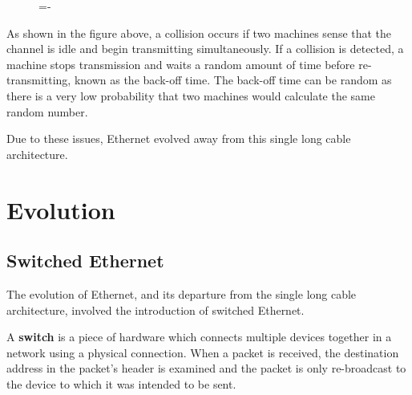 \documentclass[a4paper]{systems-software}
\begin{document}
\begin{figure}[H]
	\lineskip=-\fboxrule
\end{figure}

As shown in the figure above, a collision occurs if two machines sense that the channel is idle and begin transmitting simultaneously. If a collision is detected, a machine stops transmission and waits a random amount of time before re-transmitting, known as the back-off time. The back-off time can be random as there is a very low probability that two machines would calculate the same random number.

Due to these issues, Ethernet evolved away from this single long cable architecture.


\section*{Evolution}

\subsection*{Switched Ethernet}

The evolution of Ethernet, and its departure from the single long cable architecture, involved the introduction of switched Ethernet.

A \textbf{switch} is a piece of hardware which connects multiple devices together in a network using a physical connection. When a packet is received, the destination address in the packet’s header is examined and the packet is only re-broadcast to the device to which it was intended to be sent.
\end{document}
